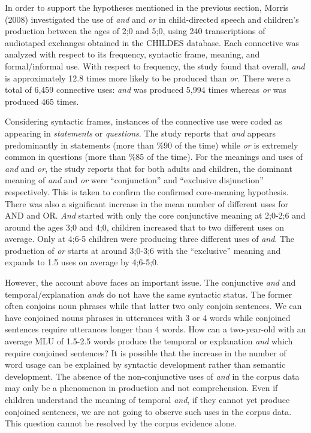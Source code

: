\documentclass[oneside]{report}
\theoremstyle{definition}
\theoremstyle{definition}
\theoremstyle{definition}
\theoremstyle{remark}
\begin{document}
In order to support the hypotheses mentioned in the previous section,
Morris (2008) investigated the use of \emph{and} and \emph{or} in
child-directed speech and children's production between the ages of 2;0
and 5;0, using 240 transcriptions of audiotaped exchanges obtained in
the CHILDES database. Each connective was analyzed with respect to its
frequency, syntactic frame, meaning, and formal/informal use. With
respect to frequency, the study found that overall, \emph{and} is
approximately 12.8 times more likely to be produced than \emph{or}.
There were a total of 6,459 connective uses: \emph{and} was produced
5,994 times whereas \emph{or} was produced 465 times.

Considering syntactic frames, instances of the connective use were coded
as appearing in \emph{statements} or \emph{questions}. The study reports
that \emph{and} appears predominantly in statements (more than \%90 of
the time) while \emph{or} is extremely common in questions (more than
\%85 of the time). For the meanings and uses of \emph{and} and
\emph{or}, the study reports that for both adults and children, the
dominant meaning of \emph{and} and \emph{or} were ``conjunction'' and
``exclusive disjunction'' respectively. This is taken to confirm the
confirmed core-meaning hypothesis. There was also a significant increase
in the mean number of different uses for AND and OR. \emph{And} started
with only the core conjunctive meaning at 2;0-2;6 and around the ages
3;0 and 4;0, children increased that to two different uses on average.
Only at 4;6-5 children were producing three different uses of
\emph{and}. The production of \emph{or} starts at around 3;0-3;6 with
the ``exclusive'' meaning and expands to 1.5 uses on average by 4;6-5;0.

However, the account above faces an important issue. The conjunctive
\emph{and} and temporal/explanation \emph{and}s do not have the same
syntactic status. The former often conjoins noun phrases while that
latter two only conjoin sentences. We can have conjoined nouns phrases
in utterances with 3 or 4 words while conjoined sentences require
utterances longer than 4 words. How can a two-year-old with an average
MLU of 1.5-2.5 words produce the temporal or explanation \emph{and}
which require conjoined sentences? It is possible that the increase in
the number of word usage can be explained by syntactic development
rather than semantic development. The absence of the non-conjunctive
uses of \emph{and} in the corpus data may only be a phenomenon in
production and not comprehension. Even if children understand the
meaning of temporal \emph{and}, if they cannot yet produce conjoined
sentences, we are not going to observe such uses in the corpus data.
This question cannot be resolved by the corpus evidence alone.
\end{document}
